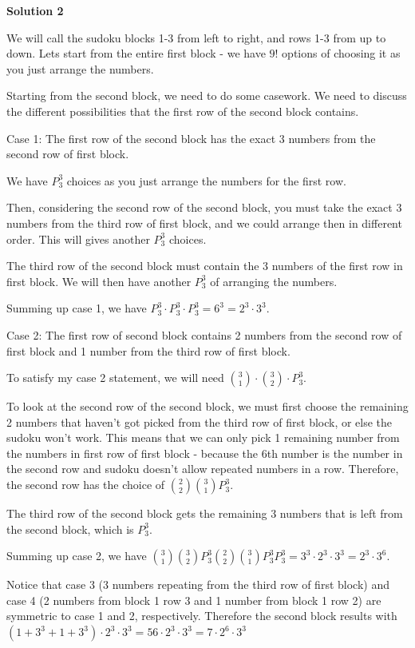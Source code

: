 \begin{enumerate}
\textbf{Solution 2}

We will call the sudoku blocks 1-3 from left to right, and rows 1-3 from up to down. Lets start from the entire first block - we have $9!$ options of choosing it as you just arrange the numbers.

 Starting from the second block, we need to do some casework. We need to discuss the different possibilities that the first row of the second block contains. 

 Case 1: The first row of the second block has the exact 3 numbers from the second row of first block. 

 We have $P^3_3$ choices as you just arrange the numbers for the first row. 

 Then, considering the second row of the second block, you must take the exact 3 numbers from the third row of first block, and we could arrange then in different order. This will gives another $P^3_3$ choices. 

 The third row of the second block must contain the 3 numbers of the first row in first block. We will then have another $P^3_3$ of arranging the numbers. 

 Summing up case 1, we have $P^3_3 \cdot P^3_3 \cdot P^3_3 = 6^3 = 2^3 \cdot 3^3$.

 Case 2: The first row of second block contains 2 numbers from the second row of first block and 1 number from the third row of first block.

 To satisfy my case 2 statement, we will need $\binom{3}{1}\cdot\binom{3}{2}\cdot P^3_3$.

 To look at the second row of the second block, we must first choose the remaining 2 numbers that haven't got picked from the third row of first block, or else the sudoku won't work. This means that we can only pick 1 remaining number from the numbers in first row of first block - because the 6th number is the number in the second row and sudoku doesn't allow repeated numbers in a row. Therefore, the second row has the choice of $\binom{2}{2}\binom{3}{1}P^3_3$. 

 The third row of the second block gets the remaining 3 numbers that is left from the second block, which is $P^3_3$. 

 Summing up case 2, we have $\binom{3}{1}\binom{3}{2}P^3_3\binom{2}{2}\binom{3}{1}P^3_3P^3_3= 3^3\cdot2^3\cdot3^3 = 2^3\cdot3^6$.

 Notice that case 3 (3 numbers repeating from the third row of first block) and case 4 (2 numbers from block 1 row 3 and 1 number from block 1 row 2) are symmetric to case 1 and 2, respectively. Therefore the second block results with $(1 + 3^3 + 1 + 3^3) \cdot 2^3 \cdot 3^3 = 56 \cdot 2^3 \cdot 3^3 = 7 \cdot 2^6 \cdot 3^3$


\end{enumerate}

